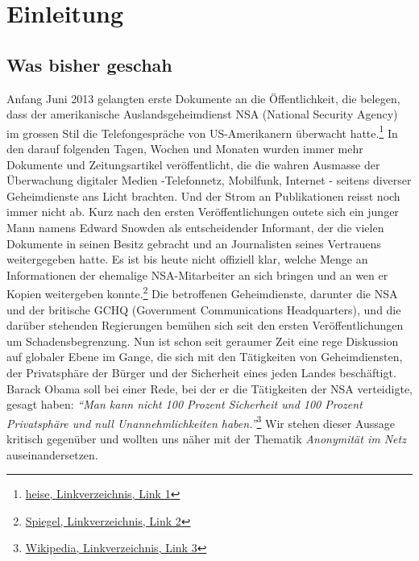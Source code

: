 \section{Einleitung}

\subsection{Was bisher geschah}
Anfang Juni 2013 gelangten erste Dokumente an die Öffentlichkeit, die belegen, dass der amerikanische Auslandsgeheimdienst NSA (National Security Agency) im grossen Stil die Telefongespräche von US-Amerikanern überwacht hatte.\footnote{\hyperlink{link1}{heise, Linkverzeichnis, Link 1}}
In den darauf folgenden Tagen, Wochen und Monaten wurden immer mehr Dokumente und Zeitungsartikel veröffentlicht, die die wahren Ausmasse der Überwachung digitaler Medien -Telefonnetz, Mobilfunk, Internet - seitens diverser Geheimdienste ans Licht brachten. Und der Strom an Publikationen reisst noch immer nicht ab. Kurz nach den ersten Veröffentlichungen outete sich ein junger Mann namens Edward Snowden als entscheidender Informant, der die vielen Dokumente in seinen Besitz gebracht und an Journalisten seines Vertrauens weitergegeben hatte. Es ist bis heute nicht offiziell klar, welche Menge an Informationen der ehemalige NSA-Mitarbeiter an sich bringen und an wen er Kopien weitergeben konnte.\footnote{\hyperlink{link2}{Spiegel, Linkverzeichnis, Link 2}}
Die betroffenen Geheimdienste, darunter die NSA und der britische GCHQ (Government Communications Headquarters), und die darüber stehenden Regierungen bemühen sich seit den ersten Veröffentlichungen um Schadensbegrenzung. Nun ist schon seit geraumer Zeit eine rege Diskussion auf globaler Ebene im Gange, die sich mit den Tätigkeiten von Geheimdiensten, der Privatsphäre der Bürger und der Sicherheit eines jeden Landes beschäftigt. Barack Obama soll bei einer Rede, bei der er die Tätigkeiten der NSA verteidigte, gesagt haben: \textit{``Man kann nicht 100 Prozent Sicherheit und 100 Prozent Privatsphäre und null Unannehmlichkeiten haben.''}\footnote{\hyperlink{link3}{Wikipedia, Linkverzeichnis, Link 3}}
Wir stehen dieser Aussage kritisch gegenüber und wollten uns näher mit der Thematik \textit{Anonymität im Netz} auseinandersetzen.

